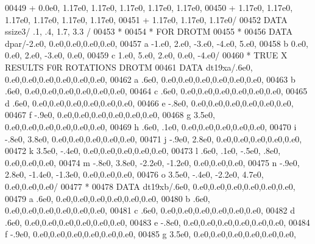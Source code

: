 \begin{DoxyCode}
00449      +                  0.0e0, 1.17e0, 1.17e0, 1.17e0, 1.17e0, 1.17e0,
00450      +                  1.17e0, 1.17e0, 1.17e0, 1.17e0, 1.17e0, 1.17e0,
00451      +                  1.17e0, 1.17e0, 1.17e0/
00452       \textcolor{keyword}{DATA}              ssize3/ .1, .4, 1.7, 3.3 /
00453 \textcolor{comment}{*}
00454 \textcolor{comment}{*                         FOR DROTM}
00455 \textcolor{comment}{*}
00456       \textcolor{keyword}{DATA} dpar/-2.e0,  0.e0,0.e0,0.e0,0.e0,
00457      a          -1.e0,  2.e0, -3.e0, -4.e0,  5.e0,
00458      b           0.e0,  0.e0,  2.e0, -3.e0,  0.e0,
00459      c           1.e0,  5.e0,  2.e0,  0.e0, -4.e0/
00460 \textcolor{comment}{*                        TRUE X RESULTS F0R ROTATIONS DROTM}
00461       \textcolor{keyword}{DATA} dt19xa/.6e0,                  0.e0,0.e0,0.e0,0.e0,0.e0,0.e0,
00462      a            .6e0,                  0.e0,0.e0,0.e0,0.e0,0.e0,0.e0,
00463      b            .6e0,                  0.e0,0.e0,0.e0,0.e0,0.e0,0.e0,
00464      c            .6e0,                  0.e0,0.e0,0.e0,0.e0,0.e0,0.e0,
00465      d            .6e0,                  0.e0,0.e0,0.e0,0.e0,0.e0,0.e0,
00466      e           -.8e0,                  0.e0,0.e0,0.e0,0.e0,0.e0,0.e0,
00467      f           -.9e0,                  0.e0,0.e0,0.e0,0.e0,0.e0,0.e0,
00468      g           3.5e0,                  0.e0,0.e0,0.e0,0.e0,0.e0,0.e0,
00469      h            .6e0,   .1e0,             0.e0,0.e0,0.e0,0.e0,0.e0,
00470      i           -.8e0,  3.8e0,             0.e0,0.e0,0.e0,0.e0,0.e0,
00471      j           -.9e0,  2.8e0,             0.e0,0.e0,0.e0,0.e0,0.e0,
00472      k           3.5e0,  -.4e0,             0.e0,0.e0,0.e0,0.e0,0.e0,
00473      l            .6e0,   .1e0,  -.5e0,   .8e0,          0.e0,0.e0,0.e0,
00474      m           -.8e0,  3.8e0, -2.2e0, -1.2e0,          0.e0,0.e0,0.e0,
00475      n           -.9e0,  2.8e0, -1.4e0, -1.3e0,          0.e0,0.e0,0.e0,
00476      o           3.5e0,  -.4e0, -2.2e0,  4.7e0,          0.e0,0.e0,0.e0/
00477 \textcolor{comment}{*}
00478       \textcolor{keyword}{DATA} dt19xb/.6e0,                  0.e0,0.e0,0.e0,0.e0,0.e0,0.e0,
00479      a            .6e0,                  0.e0,0.e0,0.e0,0.e0,0.e0,0.e0,
00480      b            .6e0,                  0.e0,0.e0,0.e0,0.e0,0.e0,0.e0,
00481      c            .6e0,                  0.e0,0.e0,0.e0,0.e0,0.e0,0.e0,
00482      d            .6e0,                  0.e0,0.e0,0.e0,0.e0,0.e0,0.e0,
00483      e           -.8e0,                  0.e0,0.e0,0.e0,0.e0,0.e0,0.e0,
00484      f           -.9e0,                  0.e0,0.e0,0.e0,0.e0,0.e0,0.e0,
00485      g           3.5e0,                  0.e0,0.e0,0.e0,0.e0,0.e0,0.e0,

\end{DoxyCode}

